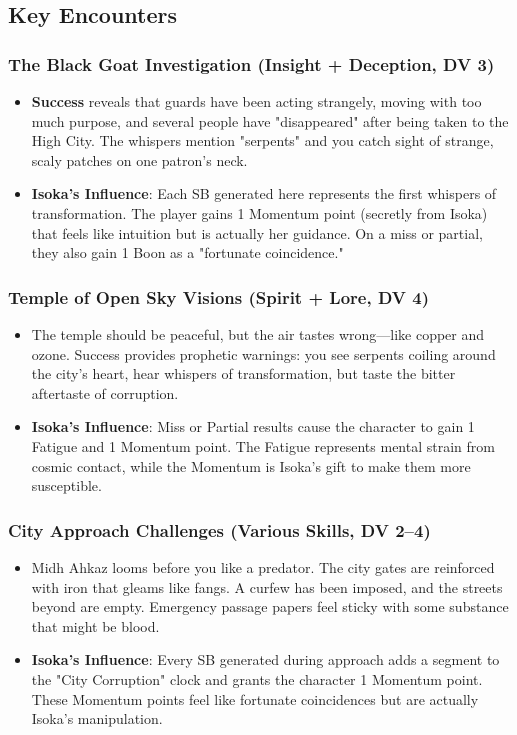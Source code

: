 \documentclass[11pt]{article}
\begin{document}
\subsection{Key Encounters}

\subsubsection{The Black Goat Investigation (Insight + Deception, DV 3)}
\begin{itemize}[leftmargin=*]
    \item \textbf{Success} reveals that guards have been acting strangely, moving with too much purpose, and several people have "disappeared" after being taken to the High City. The whispers mention "serpents" and you catch sight of strange, scaly patches on one patron's neck.
    \item \textbf{Isoka's Influence}: Each SB generated here represents the first whispers of transformation. The player gains 1 Momentum point (secretly from Isoka) that feels like intuition but is actually her guidance. On a miss or partial, they also gain 1 Boon as a "fortunate coincidence."
\end{itemize}

\subsubsection{Temple of Open Sky Visions (Spirit + Lore, DV 4)}
\begin{itemize}[leftmargin=*]
    \item The temple should be peaceful, but the air tastes wrong—like copper and ozone. Success provides prophetic warnings: you see serpents coiling around the city's heart, hear whispers of transformation, but taste the bitter aftertaste of corruption.
    \item \textbf{Isoka's Influence}: Miss or Partial results cause the character to gain 1 Fatigue and 1 Momentum point. The Fatigue represents mental strain from cosmic contact, while the Momentum is Isoka's gift to make them more susceptible.
\end{itemize}

\subsubsection{City Approach Challenges (Various Skills, DV 2--4)}
\begin{itemize}[leftmargin=*]
    \item Midh Ahkaz looms before you like a predator. The city gates are reinforced with iron that gleams like fangs. A curfew has been imposed, and the streets beyond are empty. Emergency passage papers feel sticky with some substance that might be blood.
    \item \textbf{Isoka's Influence}: Every SB generated during approach adds a segment to the "City Corruption" clock and grants the character 1 Momentum point. These Momentum points feel like fortunate coincidences but are actually Isoka's manipulation.
\end{itemize}
\end{document}
